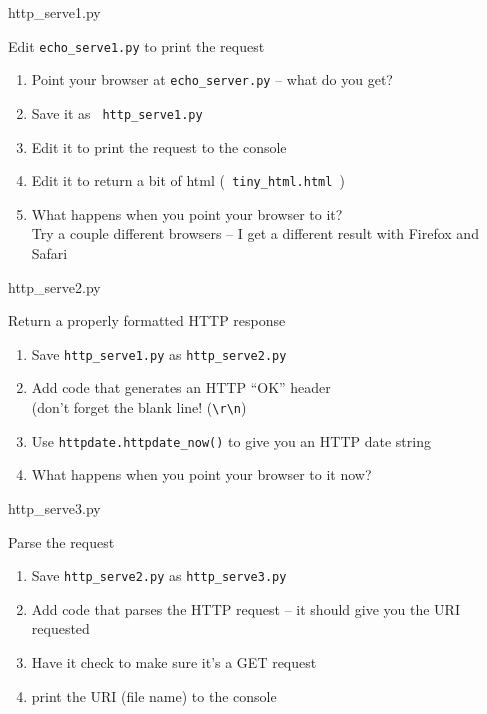 \documentclass{beamer}
\begin{document}
\begin{frame}[fragile]{http\_serve1.py}

{\Large Edit \verb|echo_serve1.py| to print the request}
\begin{enumerate}
  \item Point your browser at \verb|echo_server.py| -- what do you get?
  \item Save it as \verb| http_serve1.py |
  \item Edit it to print the request to the console
  \item Edit it to return a bit of html (\verb| tiny_html.html |)
  \item What happens when you point your browser to it? \\
        Try a couple different browsers -- I get a different result with Firefox and Safari
\end{enumerate}

\end{frame}

\begin{frame}[fragile]{http\_serve2.py}

{\Large Return a properly formatted HTTP response}
\begin{enumerate}
  \item Save \verb|http_serve1.py|  as \verb|http_serve2.py|
  \item Add code that generates an HTTP ``OK'' header \\
        (don't forget the blank line! (\verb|\r\n|)
  \item Use \verb|httpdate.httpdate_now()| to give you an HTTP date string
  \item What happens when you point your browser to it now?
\end{enumerate}

\end{frame}

\begin{frame}[fragile]{http\_serve3.py}

{\Large Parse the request}
\begin{enumerate}
  \item Save \verb|http_serve2.py|  as \verb|http_serve3.py|
  \item Add code that parses the HTTP request -- it should give you the URI requested
  \item Have it check to make sure it's a GET request
  \item print the URI (file name) to the console
\end{enumerate}

\end{frame}
\end{document}
